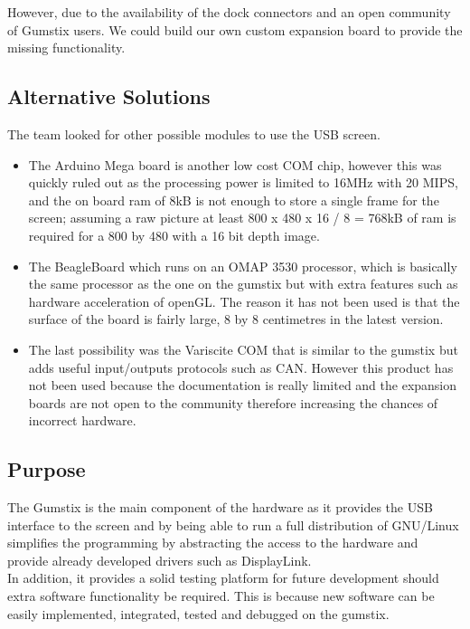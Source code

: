 \documentclass[11pt]{report} %
\begin{document}
		However, due to the availability of the dock connectors and an open
		community of Gumstix users. We could build our own custom expansion
		board to provide the missing functionality.
	
		\subsection{Alternative Solutions}
		The team looked for other possible modules to use the USB screen.
	
		\begin{itemize}
			\item The Arduino Mega board is another low cost COM chip, however this 
			was quickly ruled out as the
			processing power is limited to 16MHz with 20 MIPS, and the on board ram
			of 8kB is not enough to store a single frame for the screen; assuming
			a raw picture at least 800 x 480 x 16 / 8 = 768kB of ram is required
			for a 800 by 480 with a 16 bit depth image.
		
			\item The BeagleBoard which runs on an OMAP 3530 processor, which is 
			basically the same
			processor as the one on the gumstix but with extra features such as
			hardware acceleration of openGL. The reason it has not been used is
			that the surface of the board is fairly large, 8 by 8 centimetres in the
			latest version.
		
			\item The last possibility was the Variscite COM that is similar to
			the gumstix but adds useful input/outputs protocols such as CAN. 
			However this product has not been used because the documentation is
			really limited and the expansion boards are not open to the community
			therefore increasing the chances of incorrect hardware. 
		\end{itemize} 
	
		\subsection{Purpose}
		The Gumstix is the main component of the hardware as it provides the USB
		interface to the screen and by being able to run a full distribution of
		GNU/Linux simplifies the programming by abstracting the access to the
		hardware and provide already developed drivers such as DisplayLink.\\
		In addition, it provides a solid testing platform for future development
		should extra software functionality be required. This is because new 
		software
		can be easily implemented, integrated, tested and 
		debugged on the gumstix.
	
\end{document}
